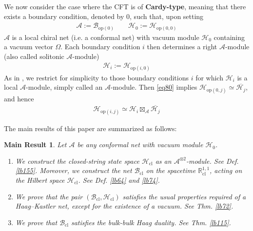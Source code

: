\documentclass[11pt,b5paper,notitlepage]{article}
\theoremstyle{definition}
\theoremstyle{plain}
\newtheorem{mrs}[df]{Main Result}
\newcommand{\ovl}{\overline}
\newcommand{\MA}{\mathcal A}
\newcommand{\MH}{\mathcal H}
\newcommand{\Maa}{{\mathcal A^{\otimes 2}}}
\newcommand{\Rcl}{\mathbb R^{1,1}_{\mathrm{cl}}}
\newcommand{\Bcl}{\mathcal B_{\mathrm{cl}}}
\newcommand{\Hcl}{\mathcal H_{\mathrm{cl}}}
\newcommand{\Bop}[1]{\mathcal B_{\mathrm{op}({#1})}}
\newcommand{\Hop}[1]{\mathcal H_{\mathrm{op}({#1})}}
\newcommand{\Hopij}{\mathcal H_{\mathrm{op}(i,j)}}
\numberwithin{equation}{section}
\begin{document}
We now consider the case where the CFT is of \textbf{Cardy-type}, meaning that there exists a boundary condition, denoted by $0$, such that, upon setting
\begin{align*}
\MA:=\Bop{0}\qquad\MH_0:=\Hop{0,0}
\end{align*}
$\MA$ is a local chiral net (i.e. a conformal net) with vacuum module $\MH_0$ containing a vacuum vector $\Omega$. Each boundary condition $i$ then determines a right $\MA$-module (also called solitonic $\MA$-module)
\begin{align*}
\MH_i:=\Hop{i,0}
\end{align*}
As in \cite{FFFS02}, we restrict for simplicity to those boundary conditions $i$ for which $\MH_i$ is a local $\MA$-module, simply called an $\MA$-module. Then \eqref{eq80} implies $\Hop{0,j}\simeq\ovl{\MH_j}$, and hence
\begin{align}\label{eq81}
\Hopij\simeq\MH_i\boxtimes_\MA\ovl{\MH_j}
\end{align}


The main results of this paper are summarized as follows:

\begin{mrs}\label{lb157}
Let $\MA$ be any conformal net with vacuum module $\MH_0$. 
\begin{enumerate}[label=(\arabic*)]
\item We construct the closed-string state space $\Hcl$ as an $\Maa$-module. See Def. \ref{lb155}. Moreover, we construct the net $\Bcl$ on the spacetime $\Rcl$, acting on the Hilbert space $\Hcl$. See Def. \ref{lb64} and \ref{lb74}. 
\item We prove that the pair $(\Bcl,\Hcl)$ satisfies the usual properties required of a Haag--Kastler net, except for the existence of a vacuum. See Thm. \ref{lb72}.
\item We prove that $\Bcl$ satisfies the bulk-bulk Haag duality. See Thm. \ref{lb115}.
\end{enumerate}
\end{mrs}
\end{document}
